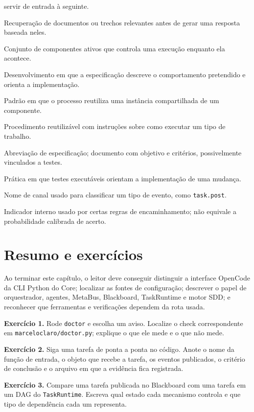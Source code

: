\begin{resultado}
{\begin{description}[leftmargin=3.2cm,style=nextline,itemsep=1pt]
servir de entrada à seguinte.
\item[RAG] Recuperação de documentos ou trechos relevantes antes de gerar uma
resposta baseada neles.
\item[Runtime] Conjunto de componentes ativos que controla uma execução enquanto ela
acontece.
\item[SDD] Desenvolvimento em que a especificação descreve o comportamento
pretendido e orienta a implementação.
\item[Singleton] Padrão em que o processo reutiliza uma instância compartilhada de
um componente.
\item[Skill] Procedimento reutilizável com instruções sobre como executar um tipo
de trabalho.
\item[Spec] Abreviação de especificação; documento com objetivo e critérios,
possivelmente vinculados a testes.
\item[TDD] Prática em que testes executáveis orientam a implementação de uma
mudança.
\item[Tópico] Nome de canal usado para classificar um tipo de evento, como
\texttt{task.post}.
\item[Trust / confiança] Indicador interno usado por certas regras de encaminhamento;
não equivale a probabilidade calibrada de acerto.
\end{description}
}
\end{resultado}

\section{Resumo e exercícios}

\begin{resultado}
Ao terminar este capítulo, o leitor deve conseguir distinguir a interface
OpenCode da CLI Python do Core; localizar as fontes de configuração; descrever
o papel de orquestrador, agentes, MetaBus, Blackboard, TaskRuntime e motor SDD;
e reconhecer que ferramentas e verificações dependem da rota usada.

\textbf{Exercício 1.} Rode \texttt{doctor} e escolha um aviso. Localize o check
correspondente em \texttt{marceloclaro/doctor.py}; explique o que ele mede e o
que não mede.

\textbf{Exercício 2.} Siga uma tarefa de ponta a ponta no código. Anote o nome
da função de entrada, o objeto que recebe a tarefa, os eventos publicados, o
critério de conclusão e o arquivo em que a evidência fica registrada.

\textbf{Exercício 3.} Compare uma tarefa publicada no Blackboard com uma tarefa
em um DAG do \texttt{TaskRuntime}. Escreva qual estado cada mecanismo controla
e que tipo de dependência cada um representa.
\end{resultado}



